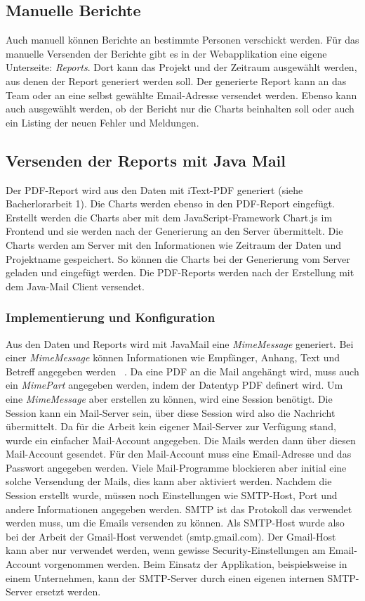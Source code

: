 \subsection{Manuelle Berichte}
Auch manuell können Berichte an bestimmte Personen verschickt werden. Für das manuelle Versenden der Berichte gibt es in der Webapplikation eine eigene Unterseite: \textit{Reports}. Dort kann das Projekt und der Zeitraum ausgewählt werden, aus denen der Report generiert werden soll. Der generierte Report kann an das Team oder an eine selbst gewählte Email-Adresse versendet werden. Ebenso kann auch ausgewählt werden, ob der Bericht nur die Charts beinhalten soll oder auch ein Listing der neuen Fehler und Meldungen.
\subsection{Versenden der Reports mit Java Mail}
Der PDF-Report wird aus den Daten mit iText-PDF generiert (siehe Bacherlorarbeit 1). Die Charts werden ebenso in den PDF-Report eingefügt. Erstellt werden die Charts aber mit dem JavaScript-Framework Chart.js im Frontend und sie werden nach der Generierung an den Server übermittelt. Die Charts werden am Server mit den Informationen wie Zeitraum der Daten und Projektname gespeichert. So können die Charts bei der Generierung vom Server geladen und eingefügt werden. Die PDF-Reports werden nach der Erstellung mit dem Java-Mail Client versendet. 
\subsubsection{Implementierung und Konfiguration} 
Aus den Daten und Reports wird mit JavaMail eine \textit{MimeMessage} generiert. Bei einer \textit{MimeMessage} können Informationen wie Empfänger, Anhang, Text und Betreff angegeben werden ~\parencite{harold2013javamail}. Da eine PDF an die Mail angehängt wird, muss auch ein \textit{MimePart} angegeben werden, indem der Datentyp PDF definert wird. Um eine \textit{MimeMessage} aber erstellen zu können, wird eine Session benötigt. Die Session kann ein Mail-Server sein, über diese Session wird also die Nachricht übermittelt. Da für die Arbeit kein eigener Mail-Server zur Verfügung stand, wurde ein einfacher Mail-Account angegeben. Die Mails werden dann über diesen Mail-Account gesendet. Für den Mail-Account muss eine Email-Adresse und das Passwort angegeben werden. Viele Mail-Programme blockieren aber initial eine solche Versendung der Mails, dies kann aber aktiviert werden. Nachdem die Session erstellt wurde, müssen noch Einstellungen wie SMTP-Host, Port und andere Informationen angegeben werden. SMTP ist das Protokoll das verwendet werden muss, um die Emails versenden zu können. Als SMTP-Host wurde also bei der Arbeit der Gmail-Host verwendet (smtp.gmail.com). Der Gmail-Host kann aber nur verwendet werden, wenn gewisse Security-Einstellungen am Email-Account vorgenommen werden. Beim Einsatz der Applikation, beispielsweise in einem Unternehmen, kann der SMTP-Server durch einen eigenen internen SMTP-Server ersetzt werden.
